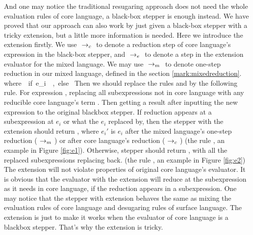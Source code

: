 \label{mark:blackbox}
And one may notice the traditional resugaring approach does not need the whole evaluation rules of core language, a black-box stepper is enough instead. We have proved that our approach can also work by just given a black-box stepper with a tricky extension, but a little more information is needed. Here we introduce the extension firstly.
We use $~\rightarrow_c~$ to denote a reduction step of core language's expression in the black-box stepper, and $~\rightarrow_e~$ to denote a step in the extension evaluator for the mixed language. We may use $~\rightarrow_m~$ to denote one-step reduction in our mixed language, defined in the section \ref{mark:mixedreduction}.
{}
{\\where~~if~e_i~\in~,~else~}
{}
Then we should replace the rules  and  by the following rule.
{}
For expression , replacing all subexpressions not in core language with any reducible core language's term . Then getting a result after inputting the new expression  to the original blackbox stepper. If reduction appears at a subexpression at $e_i$ or what the $e_i$ replaced by, then the stepper with the extension should return , where $e_i'$ is $e_i$ after the mixed language's one-step reduction ($~\rightarrow_m~$) or after core language's reduction ($~\rightarrow_c~$) (the rule , an example in Figure \ref{fig:e1}). Otherwise, stepper should return , with all the replaced subexpressions replacing back. (the rule , an example in Figure \ref{fig:e2}) The extension will not violate properties of original core language's evaluator. It is obvious that the evaluator with the extension will reduce at the subexpression as it needs in core language, if the reduction appears in a subexpression. One may notice that the stepper with extension behaves the same as mixing the evaluation rules of core language and desugaring rules of surface language. The extension is just to make it works when the evaluator of core language is a blackbox stepper. That's why the extension is tricky.

